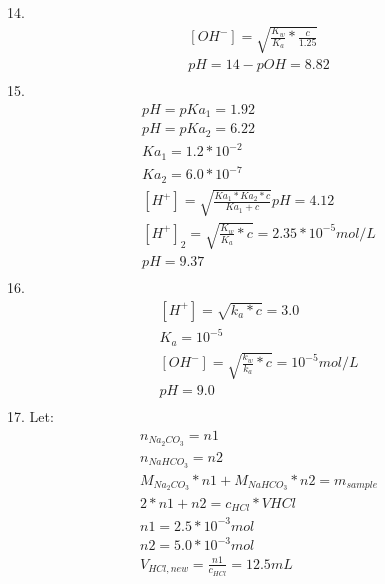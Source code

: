 \documentclass{article}
\begin{document}
14.
\begin{equation}
    \begin{multlined}
        \left[OH^-\right] = \sqrt{\frac{K_w}{K_a}*\frac{c}{1.25}}\\
        pH = 14 - pOH = 8.82\\
    \end{multlined}
\end{equation}
15.\begin{equation}
    \begin{multlined}
        pH = pKa_1 = 1.92\\
        pH = pKa_2 = 6.22\\
        Ka_1 = 1.2*10^{-2}\\
        Ka_2 = 6.0*10^{-7}\\
        \left[H^+\right] = \sqrt{\frac{Ka_1*Ka_2*c}{Ka_1+c}}
        pH = 4.12\\
        \left[H^+\right]_{2} = \sqrt{\frac{K_w}{K_a}*c} = 2.35*10^{-5} mol/L\\
        pH = 9.37\\
    \end{multlined}
\end{equation}
16.\begin{equation}
    \begin{multlined}
        \left[H^+\right] = \sqrt{k_a*c} = 3.0\\
        K_a = 10^{-5}\\
        \left[OH^-\right] = \sqrt{\frac{k_w}{k_a}*c} = 10^{-5} mol/L\\
        pH = 9.0\\
    \end{multlined}
\end{equation}
17. Let:\\
\begin{equation}
    \begin{multlined}
        n_{Na_2CO_3} = n1\\
        n_{NaHCO_3} = n2\\
        M_{Na_2CO_3}*n1+M_{NaHCO_3}*n2 = m_{sample}\\
        2*n1+n2 = c_{HCl}*V{HCl}\\
        n1 = 2.5*10^{-3} mol\\
        n2 = 5.0*10^{-3} mol\\
        V_{HCl, new} = \frac{n1}{c_{HCl}} = 12.5 mL\\
    \end{multlined}
\end{equation}
\end{document}
